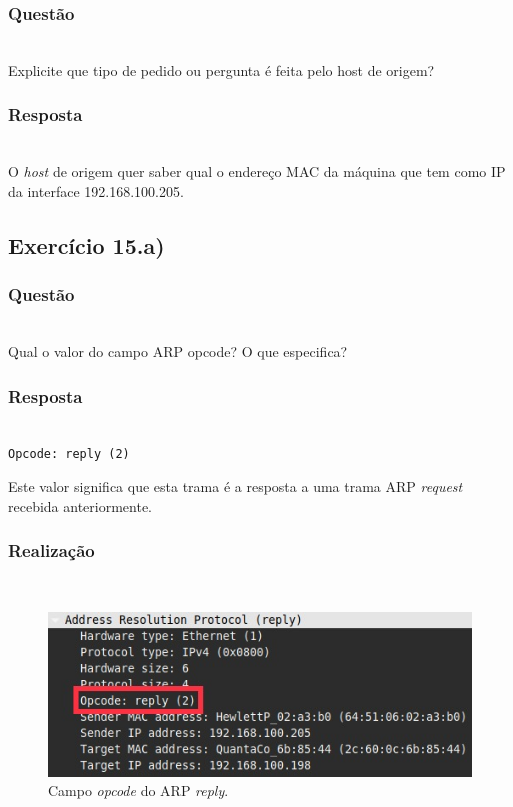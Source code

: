 \documentclass{llncs}
\begin{document}
\subsubsection{Questão}\rule[-10pt]{0pt}{10pt}\\

Explicite que tipo de pedido ou pergunta é feita pelo host de origem?

\subsubsection{Resposta}\rule[-10pt]{0pt}{10pt}\\

O \textit{host} de origem quer saber qual o endereço MAC da máquina que tem como IP da interface 192.168.100.205.


\clearpage
\subsection{Exercício 15.a)}
\subsubsection{Questão}\rule[-10pt]{0pt}{10pt}\\

Qual o valor do campo ARP opcode? O que especifica?

\subsubsection{Resposta}\rule[-10pt]{0pt}{10pt}\\

\texttt{Opcode: reply (2)}

Este valor significa que esta trama é a resposta a uma trama ARP \textit{request} recebida anteriormente.

\subsubsection{Realização}\rule[-10pt]{0pt}{10pt}\\

\begin{figure}
  \begin{center}
	  \includegraphics[scale=0.6]{./imagens/arp_reply_opcode.png} 
  \end{center}
	\caption{Campo \textit{opcode} do ARP \textit{reply}.}
  \label{fig:arp_reply_opcode}
\end{figure} 
\end{document}
